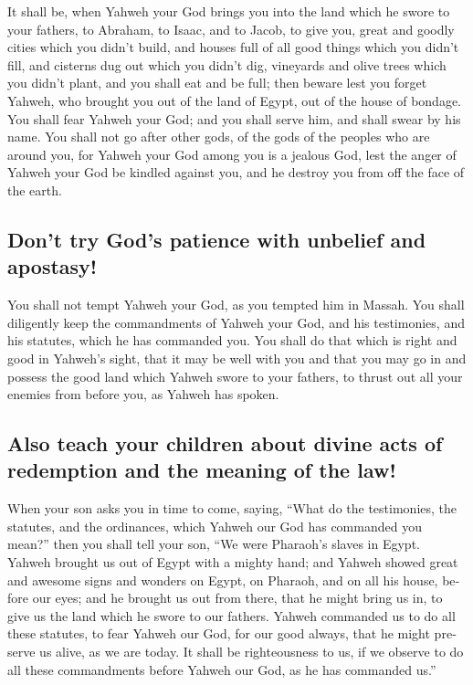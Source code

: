 \begin{paracol}{2}
\begin{otherlanguage}{english}
 It shall be, when Yahweh your God brings you into the
land which he swore to your fathers, to Abraham, to Isaac, and to Jacob,
to give you, great and goodly cities which you didn't build,
 and houses full of all good things which you didn't
fill, and cisterns dug out which you didn't dig, vineyards and olive
trees which you didn't plant, and you shall eat and be full;
 then beware lest you forget Yahweh, who brought you out
of the land of Egypt, out of the house of bondage.  You
shall fear Yahweh your God; and you shall serve him, and shall swear by
his name.  You shall not go after other gods, of the gods
of the peoples who are around you,  for Yahweh your God
among you is a jealous God, lest the anger of Yahweh your God be kindled
against you, and he destroy you from off the face of the earth.

\hypertarget{dont-try-gods-patience-with-unbelief-and-apostasy}{%
\subsection{Don't try God's patience with unbelief and
apostasy!}\label{dont-try-gods-patience-with-unbelief-and-apostasy}}

 You shall not tempt Yahweh your God, as you tempted him
in Massah.  You shall diligently keep the commandments of
Yahweh your God, and his testimonies, and his statutes, which he has
commanded you.  You shall do that which is right and good
in Yahweh's sight, that it may be well with you and that you may go in
and possess the good land which Yahweh swore to your fathers,
 to thrust out all your enemies from before you, as
Yahweh has spoken.

\hypertarget{also-teach-your-children-about-divine-acts-of-redemption-and-the-meaning-of-the-law}{%
\subsection{Also teach your children about divine acts of redemption and
the meaning of the
law!}\label{also-teach-your-children-about-divine-acts-of-redemption-and-the-meaning-of-the-law}}

 When your son asks you in time to come, saying, ``What
do the testimonies, the statutes, and the ordinances, which Yahweh our
God has commanded you mean?''  then you shall tell your
son, ``We were Pharaoh's slaves in Egypt. Yahweh brought us out of Egypt
with a mighty hand;  and Yahweh showed great and awesome
signs and wonders on Egypt, on Pharaoh, and on all his house, before our
eyes;  and he brought us out from there, that he might
bring us in, to give us the land which he swore to our fathers.
 Yahweh commanded us to do all these statutes, to fear
Yahweh our God, for our good always, that he might preserve us alive, as
we are today.  It shall be righteousness to us, if we
observe to do all these commandments before Yahweh our God, as he has
commanded us.''


\end{otherlanguage}
\end{paracol}
